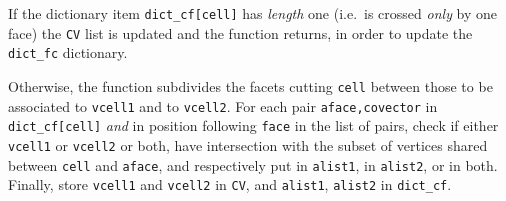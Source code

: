 \documentclass[11pt,oneside]{article}	%
\begin{document}
If the dictionary item \texttt{dict\_cf[cell]} has \emph{length} one (i.e.~is crossed  \emph{only} by one face) the \texttt{CV} list is updated and the function returns, in order to update the \texttt{dict\_fc} dictionary.

Otherwise, the function subdivides the facets cutting \texttt{cell} between those to be associated to \texttt{vcell1} and to \texttt{vcell2}. 
For each pair \texttt{aface,covector} in \texttt{dict\_cf[cell]} \emph{and} in position following \texttt{face} in the list of pairs, check if either \texttt{vcell1} or \texttt{vcell2} or both, have intersection with the subset of vertices shared between \texttt{cell} and \texttt{aface}, and respectively put in \texttt{alist1}, in \texttt{alist2}, or in both.
Finally, store \texttt{vcell1} and \texttt{vcell2} in \texttt{CV}, and \texttt{alist1}, \texttt{alist2} in \texttt{dict\_cf}.
\end{document}
